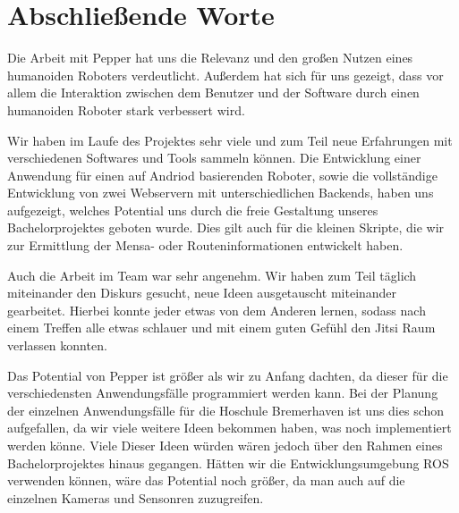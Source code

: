 \chapter{Abschließende Worte}
\label{sec:zusammenfassung}

Die Arbeit mit Pepper hat uns die Relevanz und den großen Nutzen eines humanoiden Roboters 
verdeutlicht. Außerdem hat sich für uns gezeigt, dass vor allem die Interaktion zwischen dem 
Benutzer und der Software durch einen humanoiden Roboter stark verbessert wird. 

Wir haben im Laufe des Projektes sehr viele und zum Teil neue Erfahrungen mit verschiedenen Softwares und Tools sammeln können. Die Entwicklung einer Anwendung für einen auf Andriod basierenden Roboter, sowie die vollständige Entwicklung von zwei Webservern mit unterschiedlichen Backends, haben uns aufgezeigt, welches Potential uns durch die freie Gestaltung unseres Bachelorprojektes geboten wurde. Dies gilt auch für die kleinen Skripte, die wir zur Ermittlung der Mensa- oder Routeninformationen entwickelt haben.

Auch die Arbeit im Team war sehr angenehm. Wir haben zum Teil täglich miteinander
den Diskurs gesucht, neue Ideen ausgetauscht miteinander gearbeitet. Hierbei konnte
jeder etwas von dem Anderen lernen, sodass nach einem Treffen alle etwas schlauer
und mit einem guten Gefühl den Jitsi Raum verlassen konnten.

Das Potential von Pepper ist größer als wir zu Anfang dachten, da dieser für die verschiedensten Anwendungsfälle 
programmiert werden kann. Bei der Planung der einzelnen Anwendungsfälle für die Hoschule Bremerhaven ist uns
dies schon aufgefallen, da wir viele weitere Ideen bekommen haben, was noch implementiert werden könne. Viele
Dieser Ideen würden wären jedoch über den Rahmen eines Bachelorprojektes hinaus gegangen. Hätten wir die Entwicklungsumgebung
ROS verwenden können, wäre das Potential noch größer, da man auch auf die einzelnen Kameras und Sensonren zuzugreifen.